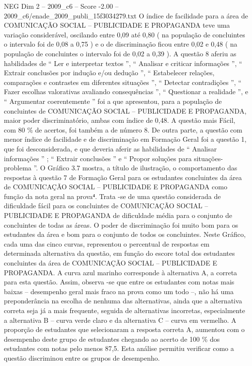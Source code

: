 \begin{textsample}{NEG Dim 2 – 2009\_c6 – Score -2.00 – 2009\_c6/enade\_2009\_publi\_15f3034279.txt}
O índice de facilidade para a área de COMUNICAÇÃO SOCIAL – PUBLICIDADE E PROPAGANDA teve uma variação considerável, oscilando entre 0,09 até 0,80 ( na população de concluintes o intervalo foi de 0,08 a 0,75 ) e o de discriminação ficou entre 0,02 e 0,48 ( na população de concluintes o intervalo foi de 0,02 a 0,39 ).
A questão 8 aferiu as habilidades de “ Ler e interpretar textos ”, “ Analisar e criticar informações ”, “ Extrair conclusões por indução e/ou dedução ”, “ Estabelecer relações, comparações e contrastes em diferentes situações ”, “ Detectar contradições ”, “ Fazer escolhas valorativas avaliando consequências ”, “ Questionar a realidade ”, e “ Argumentar coerentemente ” foi a que apresentou, para a população de concluintes de COMUNICAÇÃO SOCIAL – PUBLICIDADE E PROPAGANDA, maior poder discriminatório, ambas com índice de 0,48.
A questão mais Fácil, com 80 \% de acertos, foi também a de número 8.
De outra parte, a questão com menor índice de facilidade e de discriminação em Formação Geral foi a questão 1, que foi desconsiderada, e que deveria aferir as habilidades de “ Analisar informações ” ; “ Extrair conclusões ” e “ Propor soluções para situações-problema ”.
O Gráfico 3.7 mostra, a título de ilustração, o comportamento das respostas à questão 7 de Formação Geral para os estudantes concluintes da área de COMUNICAÇÃO SOCIAL – PUBLICIDADE E PROPAGANDA como função da nota geral na prova⁴.
Trata -se de uma questão considerada de dificuldade fácil para os concluintes de COMUNICAÇÃO SOCIAL – PUBLICIDADE E PROPAGANDA de dificuldade média para o conjunto de concluintes de todas as áreas.
O poder de discriminação foi muito bom para os estudantes da área e bom para o conjunto de todos os concluintes.
Neste Gráfico, cada uma das cinco curvas, representou o percentual de respostas em determinada alternativa da questão, em função do escore total dos estudantes concluintes da área de COMUNICAÇÃO SOCIAL – PUBLICIDADE E PROPAGANDA.
A curva azul marinho corresponde à alternativa A, a correta para esta questão.
Assim, observa -se que entre os estudantes com notas mais baixas – desempenho geral mais fraco na prova como um todo –, não há uma preponderância na escolha de nenhuma das alternativas, ainda que a alternativa correta seja já a mais frequente, seguida de alternativas incorretas, especialmente a alternativa B – curva verde claro e da alternativa C – curva em vermelho.
A proporção de estudantes que selecionaram a resposta correta A, aumentou com o desempenho deste grupo de estudantes chegando ao acerto de 100 \% dos estudantes com notas pelo menos 87,5.
Esta análise permitiu verificar como a questão discriminou entre os grupos de desempenho.

\end{textsample}
